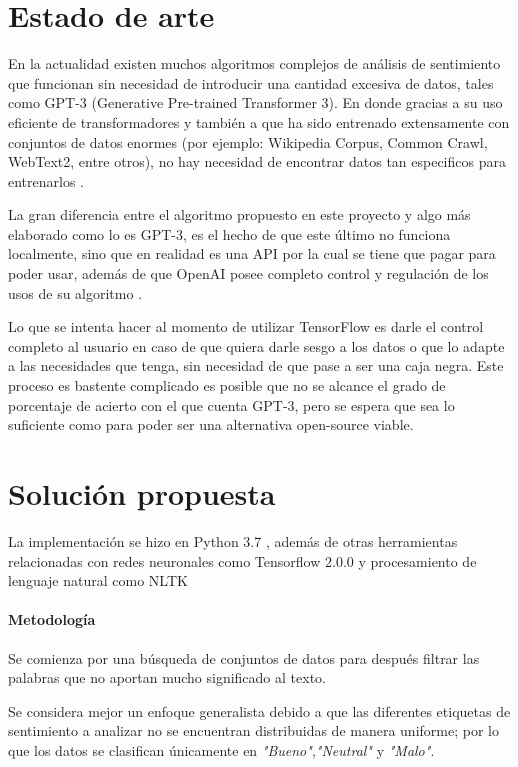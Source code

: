 \documentclass[a4]{sciposter}
\begin{document}
\begin{multicols}{3}
\begin{figure}
\end{figure}

\section{Estado de arte}

En la actualidad existen muchos algoritmos complejos de análisis de sentimiento que funcionan sin necesidad de introducir una cantidad excesiva de datos, tales como GPT-3 (Generative Pre-trained Transformer 3). En donde gracias a su uso eficiente de transformadores y también a que ha sido entrenado extensamente con conjuntos de datos enormes (por ejemplo: Wikipedia Corpus, Common Crawl, WebText2, entre otros), no hay necesidad de encontrar datos tan especificos para entrenarlos \citep{gpt3}.

La gran diferencia entre el algoritmo propuesto en este proyecto y algo más elaborado como lo es GPT-3, es el hecho de que este último no funciona localmente, sino que en realidad es una API por la cual se tiene que pagar para poder usar, además de que OpenAI posee completo control y regulación de los usos de su algoritmo \citep{openai}. 

Lo que se intenta hacer al momento de utilizar TensorFlow es darle el control completo al usuario en caso de que quiera darle sesgo a los datos o que lo adapte a las necesidades que tenga, sin necesidad de que pase a ser una caja negra. Este proceso es bastente complicado es posible que no se alcance el grado de porcentaje de acierto con el que cuenta GPT-3, pero se espera que sea lo suficiente como para poder ser una alternativa open-source viable.



\section{Solución propuesta}
La implementación se hizo en Python 3.7 \citep{python}, además de otras herramientas relacionadas con redes neuronales como Tensorflow 2.0.0 \citep{tensorflow} y procesamiento de lenguaje natural como NLTK \citep{nltk}


\paragraph{Metodología}
Se comienza por una búsqueda de conjuntos de datos para después filtrar las palabras que no aportan mucho significado al texto.

Se considera mejor un enfoque generalista debido a que las diferentes etiquetas de sentimiento a analizar no se encuentran distribuidas de manera uniforme; por lo que los datos se clasifican únicamente en \textit{"Bueno"},\textit{"Neutral"} y \textit{"Malo"}.


\end{multicols}
\end{document}
